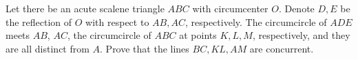 Let there be an acute scalene triangle $ABC$ with circumcenter $O$. Denote $D,E$ be the reflection of $O$ with respect to $AB,AC$, respectively. The circumcircle of $ADE$ meets $AB$, $AC$, the circumcircle of $ABC$ at points $K,L,M$, respectively, and they are all distinct from $A$. Prove that the lines $BC,KL,AM$ are concurrent.